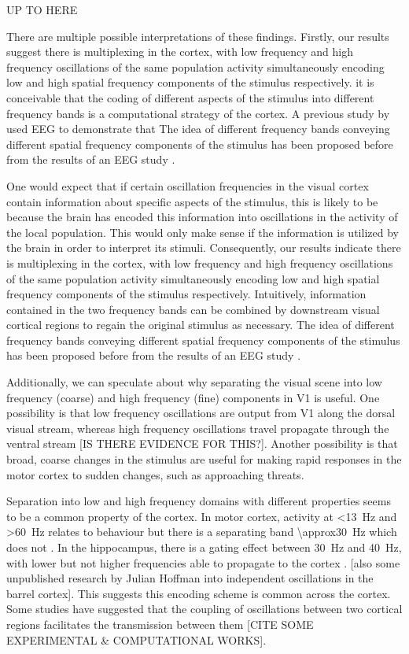 UP TO HERE

There are multiple possible interpretations of these findings.
Firstly, our results suggest there is multiplexing in the cortex, with low frequency and high frequency oscillations of the same population activity simultaneously encoding low and high spatial frequency components of the stimulus respectively.
it is conceivable that the coding of different aspects of the stimulus into different frequency bands is a computational strategy of the cortex.
A previous study by \citet{Smith2006} used \ac{EEG} to demonstrate that
The idea of different frequency bands conveying different spatial frequency components of the stimulus has been proposed before from the results of an \ac{EEG} study .

One would expect that if certain oscillation frequencies in the visual cortex contain information about specific aspects of the stimulus, this is likely to be because the brain has encoded this information into oscillations in the activity of the local population.
This would only make sense if the information is utilized by the brain in order to interpret its stimuli.
Consequently, our results indicate there is multiplexing in the cortex, with low frequency and high frequency oscillations of the same population activity simultaneously encoding low and high spatial frequency components of the stimulus respectively.
Intuitively, information contained in the two frequency bands can be combined by downstream visual cortical regions to regain the original stimulus as necessary.
The idea of different frequency bands conveying different spatial frequency components of the stimulus has been proposed before from the results of an \ac{EEG} study \citep{Smith2006}.

Additionally, we can speculate about why separating the visual scene into low frequency (coarse) and high frequency (fine) components in \ac{V1} is useful.
One possibility is that low frequency oscillations are output from \ac{V1} along the dorsal visual stream, whereas high frequency oscillations travel propagate through the ventral stream [IS THERE EVIDENCE FOR THIS?].
Another possibility is that broad, coarse changes in the stimulus are useful for making rapid responses in the motor cortex to sudden changes, such as approaching threats.

Separation into low and high frequency domains with different properties seems to be a common property of the cortex.
In motor cortex, activity at \SI{<13}{Hz} and \SI{>60}{Hz} relates to behaviour but there is a separating band \SI{\approx30}{Hz} which does not \citep{Rickert2005}.
In the hippocampus, there is a gating effect between \SI{30}{Hz} and \SI{40}{Hz}, with lower but not higher frequencies able to propagate to the cortex \citep{Moreno2015}.
[also some unpublished research by Julian Hoffman into independent oscillations in the barrel cortex].
This suggests this encoding scheme is common across the cortex.
Some studies have suggested that the coupling of oscillations between two cortical regions facilitates the transmission between them [CITE SOME EXPERIMENTAL \& COMPUTATIONAL WORKS].

